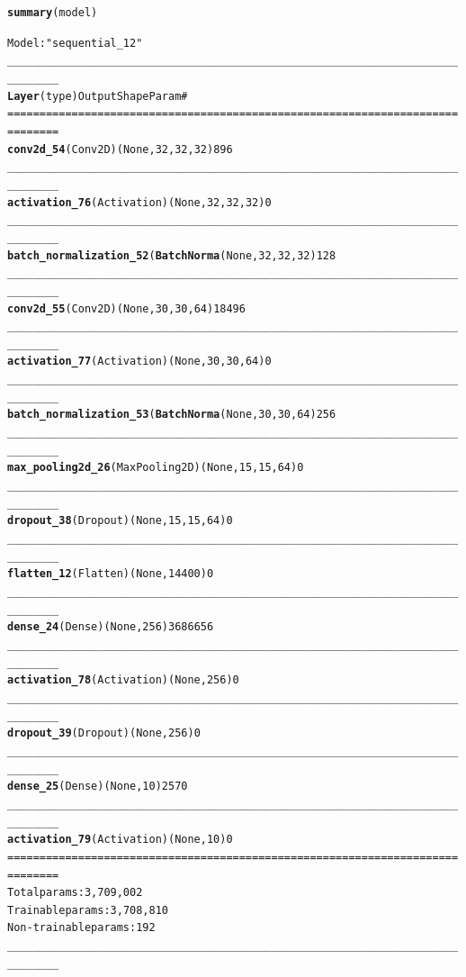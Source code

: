 \documentclass[letter,8pt]{article}\usepackage[]{graphicx}\usepackage[]{color}
\makeatletter
\newcommand{\hlstr}[1]{\textcolor[rgb]{0.192,0.494,0.8}{#1}}%
\newcommand{\hlcom}[1]{\textcolor[rgb]{0.678,0.584,0.686}{\textit{#1}}}%
\newcommand{\hlkwd}[1]{\textcolor[rgb]{0.737,0.353,0.396}{\textbf{#1}}}%
\newenvironment{kframe}{%
 \def\at@end@of@kframe{}%
 \ifinner\ifhmode%
  \def\at@end@of@kframe{\end{minipage}}%
  \begin{minipage}{\columnwidth}%
 \fi\fi%
 \def\FrameCommand##1{\hskip\@totalleftmargin \hskip-\fboxsep
 \colorbox{shadecolor}{##1}\hskip-\fboxsep
     \hskip-\linewidth \hskip-\@totalleftmargin \hskip\columnwidth}%
 \MakeFramed {\advance\hsize-\width
   \@totalleftmargin\z@ \linewidth\hsize
   \@setminipage}}%
 {\par\unskip\endMakeFramed%
 \at@end@of@kframe}
\newenvironment{knitrout}{}{} %
\makeatother
\begin{document}
\begin{knitrout}
\color{fgcolor}\begin{kframe}
\begin{alltt}
\hlkwd{summary}(model)

Model: \hlstr{"sequential_12"}
______________________________________________________________________________
\hlkwd{Layer} (type)                       Output Shape                   Param \hlcom{#     }
==============================================================================
\hlkwd{conv2d_54} (Conv2D)                 (None, 32, 32, 32)             896         
______________________________________________________________________________
\hlkwd{activation_76} (Activation)         (None, 32, 32, 32)             0           
______________________________________________________________________________
\hlkwd{batch_normalization_52} (\hlkwd{BatchNorma} (None, 32, 32, 32)             128         
______________________________________________________________________________
\hlkwd{conv2d_55} (Conv2D)                 (None, 30, 30, 64)             18496       
______________________________________________________________________________
\hlkwd{activation_77} (Activation)         (None, 30, 30, 64)             0           
______________________________________________________________________________
\hlkwd{batch_normalization_53} (\hlkwd{BatchNorma} (None, 30, 30, 64)             256         
______________________________________________________________________________
\hlkwd{max_pooling2d_26} (MaxPooling2D)    (None, 15, 15, 64)             0           
______________________________________________________________________________
\hlkwd{dropout_38} (Dropout)               (None, 15, 15, 64)             0           
______________________________________________________________________________
\hlkwd{flatten_12} (Flatten)               (None, 14400)                  0           
______________________________________________________________________________
\hlkwd{dense_24} (Dense)                   (None, 256)                    3686656     
______________________________________________________________________________
\hlkwd{activation_78} (Activation)         (None, 256)                    0           
______________________________________________________________________________
\hlkwd{dropout_39} (Dropout)               (None, 256)                    0           
______________________________________________________________________________
\hlkwd{dense_25} (Dense)                   (None, 10)                     2570        
______________________________________________________________________________
\hlkwd{activation_79} (Activation)         (None, 10)                     0           
==============================================================================
Total params: 3,709,002
Trainable params: 3,708,810
Non-trainable params: 192
______________________________________________________________________________
\end{alltt}
\end{kframe}
\end{knitrout}
\end{document}
